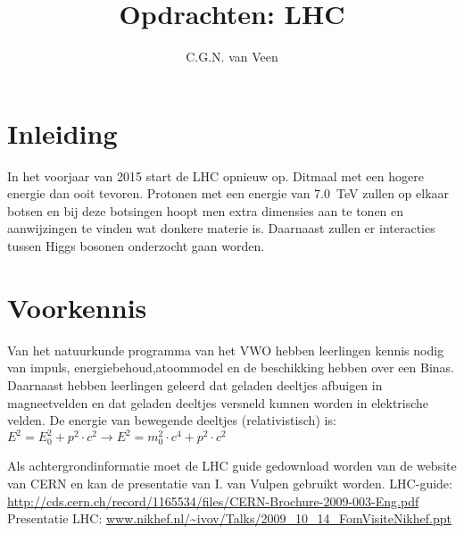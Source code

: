 

\usepackage{hepnames} 
\usepackage[version=3]{mhchem}
\usepackage{lipsum}
\usepackage{pgfplots}
\usepackage{amsmath}
\usepackage{tikz}
\usetikzlibrary{shapes}
\usetikzlibrary{positioning,arrows}
\usetikzlibrary{decorations.pathmorphing}
\usetikzlibrary{decorations.markings}


\DeclareRobustCommand{\PgDpp}{\HepParticle{\Delta}{}{++}\xspace}

\title{Opdrachten: LHC} 
\author{C.G.N. van Veen}



\maketitle

\section{Inleiding} In het voorjaar van 2015 start de LHC opnieuw op. Ditmaal 
met een hogere energie dan ooit tevoren. Protonen met een energie van \SI{7.0}{\tera\electronvolt}
zullen op elkaar botsen en bij deze botsingen hoopt men extra dimensies aan te tonen en 
aanwijzingen te vinden wat donkere materie is. Daarnaast zullen er interacties tussen Higgs bosonen 
onderzocht gaan worden.

\section{Voorkennis}

Van het natuurkunde programma van het VWO hebben leerlingen kennis nodig van impuls, 
energiebehoud,atoommodel en de beschikking hebben over een Binas.
Daarnaast hebben leerlingen geleerd dat geladen deeltjes afbuigen in magneetvelden en dat 
geladen deeltjes versneld kunnen worden in elektrische velden.
De energie van bewegende deeltjes (relativistisch) is:\\
$E^2 = E_0^2 + p^2 \cdot c^2 \rightarrow  E^2 = m_0^2 \cdot c^4 + p^2 \cdot c^2 $

Als achtergrondinformatie moet de LHC guide gedownload worden van de 
website van CERN en kan de presentatie van I. van Vulpen gebruikt worden. 
LHC-guide: \url{http://cds.cern.ch/record/1165534/files/CERN-Brochure-2009-003-Eng.pdf}
Presentatie LHC: \url{www.nikhef.nl/~ivov/Talks/2009_10_14_FomVisiteNikhef.ppt}

